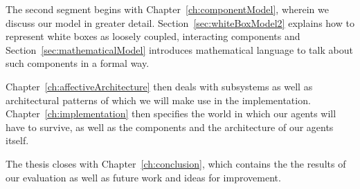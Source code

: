 The second segment begins with Chapter~\ref{ch:componentModel}, wherein we discuss our model in greater detail. Section~\ref{sec:whiteBoxModel2} explains how to represent white boxes as loosely coupled, interacting components and Section~\ref{sec:mathematicalModel} introduces mathematical language to talk about such components in a formal way.

Chapter~\ref{ch:affectiveArchitecture} then deals with subsystems as well as architectural patterns of which we will make use in the implementation. Chapter~\ref{ch:implementation} then specifies the world in which our agents will have to survive, as well as the components and the architecture of our agents itself.

The thesis closes with Chapter~\ref{ch:conclusion}, which contains the the results of our evaluation as well as future work and ideas for improvement.




